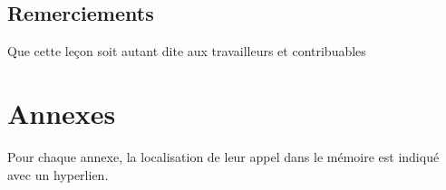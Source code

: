 \documentclass[12pt,twoside,a4paper,english,french]{book} %
\begin{document}
\frontmatter %

\thispagestyle{empty}
\cleardoublepage




\newpage
\section*{Remerciements}
%
\cleardoublepage
%
Que cette leçon soit autant dite aux travailleurs et contribuables 
\tableofcontents
\label{TOC}



\listoffigures
\newpage
\printglossaries

\mainmatter

%


\appendix %
\chapter{Annexes}
Pour chaque annexe, la localisation de leur appel dans le mémoire est indiqué avec un hyperlien.






\backmatter %

\printbibliography
\end{document}

